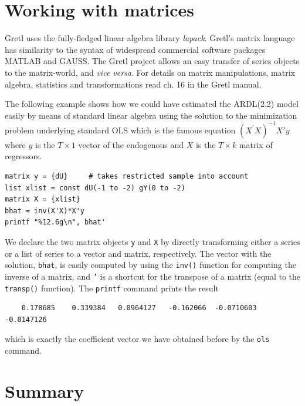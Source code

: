 \documentclass[11pt]{article}
\begin{document}
\section{Working with matrices}
Gretl uses the fully-fledged linear algebra library \textit{lapack}. Gretl's matrix language has similarity to the syntax of widespread commercial software packages MATLAB and GAUSS. The Gretl project allows an easy transfer of series objects to the matrix-world, and \textit{vice versa}. For details on matrix manipulations, matrix algebra, statistics and transformations read ch. 16 in the Gretl manual.

The following example shows how we could have estimated the ARDL(2,2) model easily by means of standard linear algebra using the solution to the minimization problem underlying standard OLS which is the famous equation $ (X^\prime X)^{-1} X'y $ where $ y $  is the $ T \times 1 $ vector of the endogenous and $ X $ is the $ T \times k $ matrix of regressors. 
\begin{Verbatim}[baselinestretch=0.75]
matrix y = {dU}		# takes restricted sample into account
list xlist = const dU(-1 to -2) gY(0 to -2)
matrix X = {xlist}
bhat = inv(X'X)*X'y
printf "%12.6g\n", bhat'
\end{Verbatim}
We declare the two matrix objects \texttt{y} and \texttt{X} by directly transforming either a series or a list of series to a vector and matrix, respectively. The vector with the solution, \texttt{bhat}, is easily computed by using the \texttt{inv()} function for computing the inverse of a matrix, and \texttt{'} is a shortcut for the transpose of a matrix (equal to the \texttt{transp()} function). The \texttt{printf} command prints the result
\begin{verbatim}
    0.178685    0.339384   0.0964127   -0.162066  -0.0710603  -0.0147126
\end{verbatim}
which is exactly the coefficient vector we have obtained before by the \texttt{ols} command.






\section{Summary}





\end{document}
